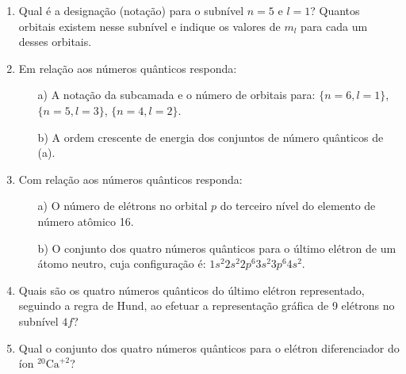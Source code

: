 \documentclass[a4paper, 12pt]{article}
\begin{document}
\begin{enumerate}
	\item Qual é a designação (notação) para o subnível \(n = 5\) e \(l = 1\)? Quantos orbitais existem nesse subnível e indique os valores de \(m_l\) para cada um desses orbitais.
	      
	\item Em relação aos números quânticos responda:
	      \begin{enumerate}
		      \item[a)] A notação da subcamada e o número de orbitais para: \(\{n = 6, l = 1\}\), \(\{n = 5, l = 3\}\), \(\{n = 4, l = 2\}\).
		      \item[b)] A ordem crescente de energia dos conjuntos de número quânticos de (a).
	      \end{enumerate}
	      
	\item Com relação aos números quânticos responda:
	      \begin{enumerate}
		      \item[a)] O número de elétrons no orbital \(p\) do terceiro nível do elemento de número atômico 16.
		      \item[b)] O conjunto dos quatro números quânticos para o último elétron de um átomo neutro, cuja configuração é: \(1s^2 2s^2 2p^6 3s^2 3p^6 4s^2\).
	      \end{enumerate}
	      
	\item Quais são os quatro números quânticos do último elétron representado, seguindo a regra de Hund, ao efetuar a representação gráfica de 9 elétrons no subnível \(4f\)?
	      
	\item Qual o conjunto dos quatro números quânticos para o elétron diferenciador do íon \(^{20}\text{Ca}^{+2}\)?
\end{enumerate}
\end{document}
